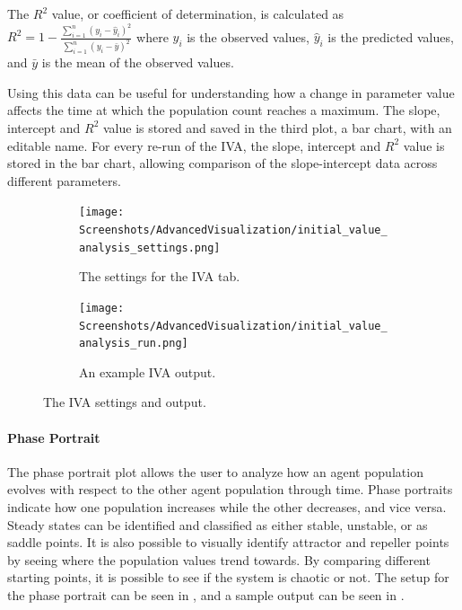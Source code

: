 The $R^2$ value, or coefficient of determination, is calculated as $R^2 = 1 - \frac{\sum_{i=1}^n (y_i - \hat{y}_i)^2}{\sum_{i=1}^n (y_i - \bar{y})^2}$
where $y_i$ is the observed values, $\hat{y}_i$ is the predicted values, and $\bar{y}$ is the mean of the observed values.

Using this data can be useful for understanding how a change in parameter value affects the time at which the population count reaches a maximum.
The slope, intercept and $R^2$ value is stored and saved in the third plot, a bar chart, with an editable name.
For every re-run of the IVA, the slope, intercept and $R^2$ value is stored in the bar chart, allowing comparison of the slope-intercept data across different parameters. 

\begin{figure}[h!]
    \centering
    \begin{subfigure}{0.49\linewidth}
        \centering
        \captionsetup{width=1\linewidth}
        \texttt{[image: Screenshots/AdvancedVisualization/initial\_value\_analysis\_settings.png]}
        \caption{
            The settings for the IVA tab. 
        }
        \label{fig:ss:av:initial_value_analysis_settings}
        \vspace*{\fill}
    \end{subfigure}
    \hfill
    \begin{subfigure}{0.49\linewidth}
        \centering
        \captionsetup{width=1\linewidth}
        \texttt{[image: Screenshots/AdvancedVisualization/initial\_value\_analysis\_run.png]}
        \caption{
            An example IVA output. 
        }
        \label{fig:ss:av:initial_value_analysis_run}
        \vspace*{\fill}
    \end{subfigure}
    \caption{The IVA settings and output. }
\end{figure}

\paragraph{Phase Portrait}
\label{sec:phase_portrait}
The phase portrait plot allows the user to analyze how an agent population evolves with respect to the other agent population through time.
Phase portraits indicate how one population increases while the other decreases, and vice versa.
Steady states can be identified and classified as either stable, unstable, or as saddle points. 
It is also possible to visually identify attractor and repeller points by seeing where the population values trend towards. 
By comparing different starting points, it is possible to see if the system is chaotic or not.
The setup for the phase portrait can be seen in , and a sample output can be seen in . 

